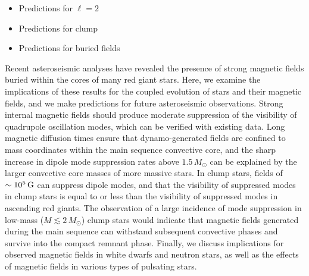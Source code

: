 \begin{itemize}
\item Predictions for $\ell = 2$
\item Predictions for clump 
\item Predictions for buried fields
\end{itemize}



Recent asteroseismic analyses have revealed the presence of strong magnetic fields buried within the cores of many red giant stars. Here, we examine the implications of these results for the coupled evolution of stars and their magnetic fields, and we make predictions for future asteroseismic observations. Strong internal magnetic fields should produce moderate suppression of the visibility of quadrupole oscillation modes, which can be verified with existing data. Long magnetic diffusion times ensure that dynamo-generated fields are confined to mass coordinates within the main sequence convective core, and the sharp increase in dipole mode suppression rates above $1.5 \, M_\odot$ can be explained by the larger convective core masses of more massive stars.
In clump stars, fields of $\sim 10^5 \, {\rm G}$ can suppress dipole modes, and that the visibility of suppressed modes in clump stars is equal to or less than the visibility of suppressed modes in ascending red giants. The observation of a large incidence of mode suppression in low-mass ($M \lesssim 2 \, M_\odot$) clump stars would indicate that magnetic fields generated during the main sequence can withstand subsequent convective phases and survive into the compact remnant phase. Finally, we discuss implications for observed magnetic fields in white dwarfs and neutron stars, as well as the effects of magnetic fields in various types of pulsating stars.
  
  